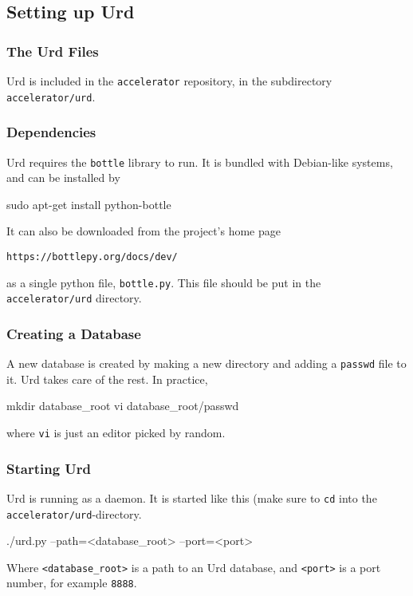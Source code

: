 \subsection{Setting up Urd}


\subsubsection{The Urd Files}

Urd is included in the \texttt{accelerator} repository, in the
subdirectory \texttt{accelerator/urd}.



\subsubsection{Dependencies}
Urd requires the \texttt{bottle} library to run.  It is bundled with
Debian-like systems, and can be installed by
\begin{shell}
sudo apt-get install python-bottle
\end{shell}
It can also be downloaded from the project's home page
\begin{verbatim}
https://bottlepy.org/docs/dev/
\end{verbatim}
as a single python file, \texttt{bottle.py}.  This file should be put
in the \texttt{accelerator/urd} directory.



\subsubsection{Creating a Database}
A new database is created by making a new directory and adding
a \texttt{passwd} file to it.  Urd takes care of the rest.  In
practice,
\begin{shell}
mkdir database_root
vi database_root/passwd
\end{shell}
where \texttt{vi} is just an editor picked by random.


\subsubsection{Starting Urd}
Urd is running as a daemon.  It is started like this (make sure
to \texttt{cd} into the \texttt{accelerator/urd}-directory.
\begin{shell}
./urd.py --path=<database_root> --port=<port>
\end{shell}
Where \texttt{<database\_root>} is a path to an Urd database,
and \texttt{<port>} is a port number, for example \texttt{8888}.

